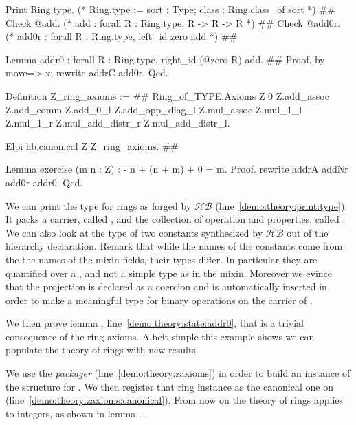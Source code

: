 \documentclass[a4paper,UKenglish,cleveref, autoref]{lipics-v2019}
\newcommand{\HB}{\ensuremath{\mathcal{HB}}}
\begin{document}
\begin{coqcode}
Print Ring.type. (* Ring.type  :=  { sort : Type;  class : Ring.class_of sort } *) #\label{demo:theory:print:type}#
Check @add.      (* add        :   forall R : Ring.type, R -> R -> R            *) #\label{demo:theory:check:zero}#
Check @add0r.    (* add0r      :   forall R : Ring.type, left_id zero add       *) #\label{demo:theory:check:add0r}#

Lemma addr0 : forall R : Ring.type, right_id (@zero R) add. #\label{demo:theory:state:addr0}#
Proof. by move=> x; rewrite addrC add0r. Qed.

Definition Z_ring_axioms :=                               #\label{demo:theory:zaxioms}#
  Ring_of_TYPE.Axioms Z 0%
    Z.add_assoc Z.add_comm Z.add_0_l Z.add_opp_diag_l
    Z.mul_assoc Z.mul_1_l Z.mul_1_r
    Z.mul_add_distr_r Z.mul_add_distr_l.

Elpi hb.canonical Z Z_ring_axioms.                        #\label{demo:theory:zaxioms:canonical}#

Lemma exercise (m n : Z) : - n + (n + m) + 0 = m.
Proof. rewrite addrA addNr add0r addr0. Qed.
\end{coqcode}

We can print the type for rings as forged by \HB{} (line~\ref{demo:theory:print:type}).
It packs a carrier, called , and the collection of operation and
properties, called .  We can also look at the type of two
constants synthesized by \HB{} out of the hierarchy declaration. Remark that
while the names of the constants come from the the names of the mixin fields,
their types differ.
In particular they are quantified over a , and not
a simple type as in the mixin. Moreover we evince that
the  projection is declared as a coercion and is automatically
inserted in order to make  a meaningful type for binary
operations on the carrier of .

We then prove lemma , line~\ref{demo:theory:state:addr0}, that is
a trivial consequence of the ring axioms. Albeit simple this example shows
we can populate the theory of rings with new results.

We use the  \emph{packager} (line~\ref{demo:theory:zaxioms})
in order to build an instance of the  structure for .
We then register that ring instance as the canonical one on 
(line~\ref{demo:theory:zaxioms:canonical}).
From now on the theory of rings applies to
integers, as shown in lemma .
.
\end{document}
